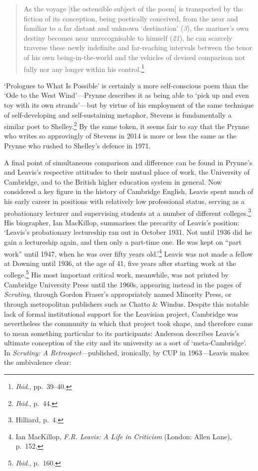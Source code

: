 \documentclass[]{article}
\begin{document}
\begin{quote}
As the voyage {[}the ostensible subject of the poem{]} is transported by
the fiction of its conception, being poetically conceived, from the near
and familiar to a far distant and unknown `destination' (\emph{3}), the
mariner's own destiny becomes near unrecognisable to himself
(\emph{21}), he can scarcely traverse these newly indefinite and
far-reaching intervals between the tenor of his own being-in-the-world
and the vehicles of devised comparison not fully nor any longer within
his control.\footnote{\emph{Ibid}., pp.~39--40.}
\end{quote}

\noindent `Prologues to What Is Possible' is certainly a more
self-conscious poem than the `Ode to the West Wind'---Prynne describes
it as being able to `pick up and even toy with its own strands'---but by
virtue of his employment of the same technique of self-developing and
self-sustaining metaphor, Stevens is fundamentally a similar poet to
Shelley.\footnote{\emph{Ibid}., p.~44.} By the same token, it seems fair
to say that the Prynne who writes so approvingly of Stevens in 2014 is
more or less the same as the Prynne who rushed to Shelley's defence in
1971.

A final point of simultaneous comparison and difference can be found in
Prynne's and Leavis's respective attitudes to their mutual place of
work, the University of Cambridge, and to the British higher education
system in general. Now considered a key figure in the history of
Cambridge English, Leavis spent much of his early career in positions
with relatively low professional status, serving as a probationary
lecturer and supervising students at a number of different
colleges.\footnote{Hilliard, p.~4.} His biographer, Ian MacKillop,
summarises the precarity of Leavis's position: `Leavis's probationary
lectureship ran out in October 1931. Not until 1936 did he gain a
lectureship again, and then only a part-time one. He was kept on ``part
work'' until 1947, when he was over fifty years old.'\footnote{Ian
  MacKillop, \emph{F.R. Leavis: A Life in Criticism} (London: Allen
  Lane), p.~152.} Leavis was not made a fellow at Downing until 1936, at
the age of 41, five years after starting work at the college.\footnote{\emph{Ibid}.,
  p.~160.} His most important critical work, meanwhile, was not printed
by Cambridge University Press until the 1960s, appearing instead in the
pages of \emph{Scrutiny}, through Gordon Fraser's appropriately named
Minority Press, or through metropolitan publishers such as Chatto \&
Windus. Despite this notable lack of formal institutional support for
the Leavisian project, Cambridge was nevertheless the community in which
that project took shape, and therefore came to mean something particular
to its participants: Anderson describes Leavis's ultimate conception of
the city and its university as a sort of `meta-Cambridge'. In
\emph{Scrutiny: A Retrospect}---published, ironically, by CUP in
1963---Leavis makes the ambivalence clear:
\end{document}
